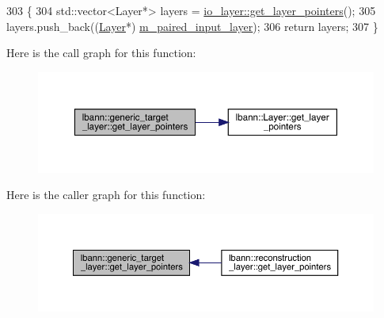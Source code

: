 \begin{DoxyCode}
303                                                   \{
304     std::vector<Layer*> layers = \hyperlink{classlbann_1_1Layer_a9f94210cbb973f1df89ef649899094a1}{io\_layer::get\_layer\_pointers}();
305     layers.push\_back((\hyperlink{classlbann_1_1Layer_a24e9c82354a0a2af1b70cbca2211e7d4}{Layer}*) \hyperlink{classlbann_1_1generic__target__layer_a84da1260e9feb4fbc3e6f2315e4cab4b}{m\_paired\_input\_layer});
306     \textcolor{keywordflow}{return} layers;
307   \}
\end{DoxyCode}
Here is the call graph for this function\+:\nopagebreak
\begin{figure}[H]
\begin{center}
\leavevmode
\includegraphics[width=350pt]{classlbann_1_1generic__target__layer_a0325a9703238ac0120893214fd0983b5_cgraph}
\end{center}
\end{figure}
Here is the caller graph for this function\+:\nopagebreak
\begin{figure}[H]
\begin{center}
\leavevmode
\includegraphics[width=350pt]{classlbann_1_1generic__target__layer_a0325a9703238ac0120893214fd0983b5_icgraph}
\end{center}
\end{figure}
\mbox{\label{classlbann_1_1generic__target__layer_a26376bcc04f9c8ec35ff99bd71de43d9}} 
